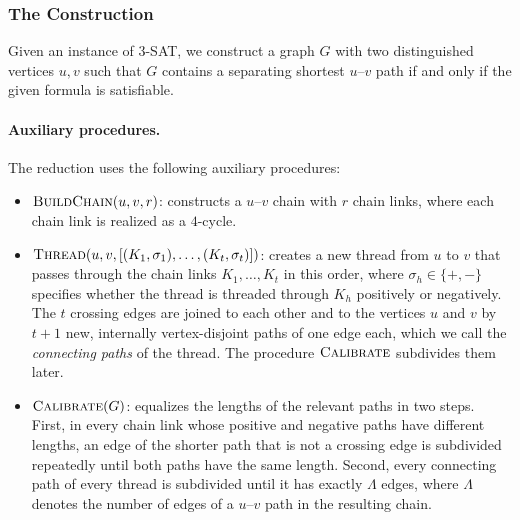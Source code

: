 \documentclass[a4paper,fleqn]{cas-sc}
\numberwithin{equation}{section}
\theoremstyle{definition}
\theoremstyle{plain}
\theoremstyle{remark}
\newcommand{\ThreeSAT}{\textsc{3-SAT}}
\begin{document}
\subsubsection{The Construction}
\label{sec:reduction-construction}
Given an instance of \ThreeSAT, we construct a graph $G$ with two distinguished vertices $u,v$ such that $G$ contains a separating shortest $u$--$v$ path if and only if the given formula is satisfiable.

\paragraph{Auxiliary procedures.}
The reduction uses the following auxiliary procedures:
\begin{itemize}
    \item $\textsc{BuildChain}(u,v,r)$: constructs a $u$--$v$ chain with $r$ chain links, where each chain link is realized as a $4$-cycle.
    \item $\textsc{Thread}(u,v,[(K_1,\sigma_1),\dots,(K_t,\sigma_t)])$: creates a new thread from $u$ to $v$ that passes through the chain links $K_1,\dots,K_t$ in this order, where $\sigma_h \in \{+,-\}$ specifies whether the thread is threaded through $K_h$ positively or negatively.
    The $t$ crossing edges are joined to each other and to the vertices $u$ and $v$ by $t+1$ new, internally vertex-disjoint paths of one edge each, which we call the \emph{connecting paths} of the thread.
    The procedure $\textsc{Calibrate}$ subdivides them later.
    \item $\textsc{Calibrate}(G)$: equalizes the lengths of the relevant paths in two steps.
    First, in every chain link whose positive and negative paths have different lengths, an edge of the shorter path that is not a crossing edge is subdivided repeatedly until both paths have the same length.
    Second, every connecting path of every thread is subdivided until it has exactly $\Lambda$ edges, where $\Lambda$ denotes the number of edges of a $u$--$v$ path in the resulting chain.
\end{itemize}
\end{document}
